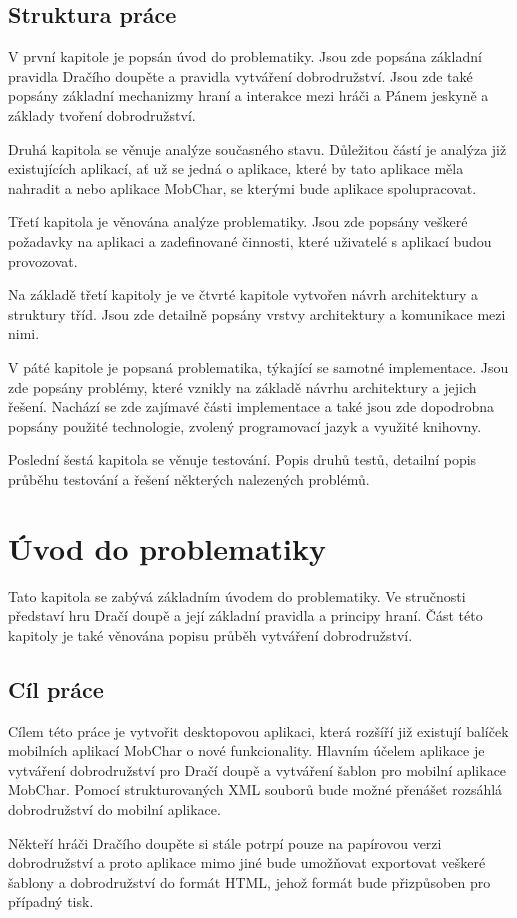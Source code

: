 \documentclass[thesis=B,czech]{resources/FITthesis}[2012/06/26]
\begin{document}
\begin{introduction}
\section*{Struktura práce}
V první kapitole je popsán úvod do problematiky. Jsou zde popsána základní pravidla Dračího doupěte a pravidla vytváření dobrodružství. Jsou zde také popsány základní mechanizmy hraní a interakce mezi hráči a Pánem jeskyně a základy tvoření dobrodružství. \par

Druhá kapitola se věnuje analýze současného stavu. Důležitou částí je analýza již existujících aplikací, ať už se jedná o aplikace, které by tato aplikace měla nahradit a nebo aplikace MobChar, se kterými bude aplikace spolupracovat. \par

Třetí kapitola je věnována analýze problematiky. Jsou zde popsány veškeré požadavky na aplikaci a zadefinované činnosti, které uživatelé s aplikací budou provozovat. \par

Na základě třetí kapitoly je ve čtvrté kapitole vytvořen návrh architektury a struktury tříd. Jsou zde detailně popsány vrstvy architektury a komunikace mezi nimi. \par

V páté kapitole je popsaná problematika, týkající se samotné implementace. Jsou zde popsány problémy, které vznikly na základě návrhu architektury a jejich řešení. Nachází se zde zajímavé části implementace a také jsou zde dopodrobna popsány použité technologie, zvolený programovací jazyk a využité knihovny. \par

Poslední šestá kapitola se věnuje testování. Popis druhů testů, detailní popis průběhu testování a řešení některých nalezených problémů.


\end{introduction}

\chapter{Úvod do problematiky}
Tato kapitola se zabývá základním úvodem do problematiky. Ve stručnosti představí hru Dračí doupě a její základní pravidla a principy hraní. Část této kapitoly je také věnována popisu průběh vytváření dobrodružství.
	\section{Cíl práce}
Cílem této práce je vytvořit desktopovou aplikaci, která rozšíří již existují balíček mobilních aplikací MobChar o nové funkcionality. Hlavním účelem aplikace je vytváření dobrodružství pro Dračí doupě a vytváření šablon pro mobilní aplikace MobChar. Pomocí strukturovaných XML souborů bude možné přenášet rozsáhlá dobrodružství do mobilní aplikace. \par
Někteří hráči Dračího doupěte si stále potrpí pouze na papírovou verzi dobrodružství a proto aplikace mimo jiné bude umožňovat exportovat veškeré šablony a dobrodružství do formát HTML, jehož formát bude přizpůsoben pro případný tisk. 
\end{document}
